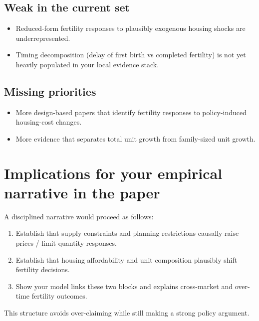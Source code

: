 \documentclass[11pt]{article}
\begin{document}
\subsection*{Weak in the current set}
\begin{itemize}
\item Reduced-form fertility responses to plausibly exogenous housing shocks are underrepresented.
\item Timing decomposition (delay of first birth vs completed fertility) is not yet heavily populated in your local evidence stack.
\end{itemize}

\subsection*{Missing priorities}
\begin{itemize}
\item More design-based papers that identify fertility responses to policy-induced housing-cost changes.
\item More evidence that separates total unit growth from family-sized unit growth.
\end{itemize}

\section{Implications for your empirical narrative in the paper}
A disciplined narrative would proceed as follows:
\begin{enumerate}
\item Establish that supply constraints and planning restrictions causally raise prices / limit quantity responses.
\item Establish that housing affordability and unit composition plausibly shift fertility decisions.
\item Show your model links these two blocks and explains cross-market and over-time fertility outcomes.
\end{enumerate}

This structure avoids over-claiming while still making a strong policy argument.
\end{document}
